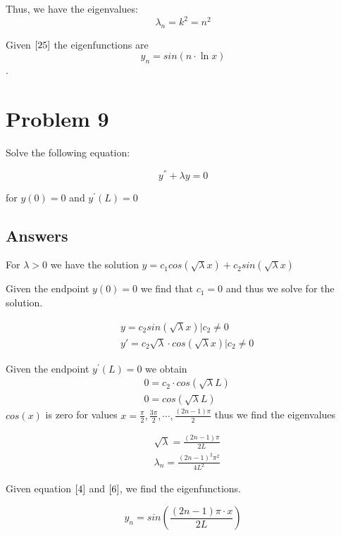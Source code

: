 \documentclass{article}
\begin{document}
Thus, we have the eigenvalues:
$$\lambda_{n} = k^2 = n^2$$

Given $\eqref{25}$ the eigenfunctions are
$$ y_n = sin \left( n\cdot \ln x \right ) $$.


\section*{Problem 9}

Solve the following equation:

\begin{equation}\label{9} y^{''} + \lambda y =0\end{equation}

for $y(0) = 0$ and $y^{'}(L)=0$
\subsection*{Answers}

For $\lambda >0$ we have the solution $y = c_1 cos\left(\sqrt \lambda x \right) + c_2 sin\left( \sqrt \lambda x \right)$

Given the endpoint $y(0) = 0$ we find that $c_1 =0$ and thus we solve for the solution.

\begin{align}
    &y = c_2 sin\left( \sqrt \lambda x \right) \Bigr| c_2 \neq 0  \label{6}  \\
    &y' = c_2 \sqrt \lambda \cdot cos \left( \sqrt \lambda x \right) \Bigr| c_2 \neq 0 \nonumber
\end{align}

Given the endpoint $y^{'}(L)=0$ we obtain
\begin{align*}
&0 = c_2 \cdot cos \left( \sqrt \lambda L \right) \\
&0 = cos\left ( \sqrt \lambda L \right)
\end{align*}
$cos(x)$ is zero for values $x = \frac{\pi}{2}, \frac{3\pi}{2}, \cdots , \frac{(2n-1) \pi}{2}$ thus we find the eigenvalues

\begin{align}
    &\sqrt \lambda = \frac{(2n-1)\pi}{2L} \nonumber \\
    & \lambda_{n} = \frac{(2n-1)^2 \pi^2}{4L^2} \label{4}
\end{align}

Given equation $\eqref{4}$ and $\eqref{6}$, we find the eigenfunctions.

$$
y_n = sin \left ( \frac{(2n-1)\pi\cdot x}{2L} \right)
$$
\end{document}
